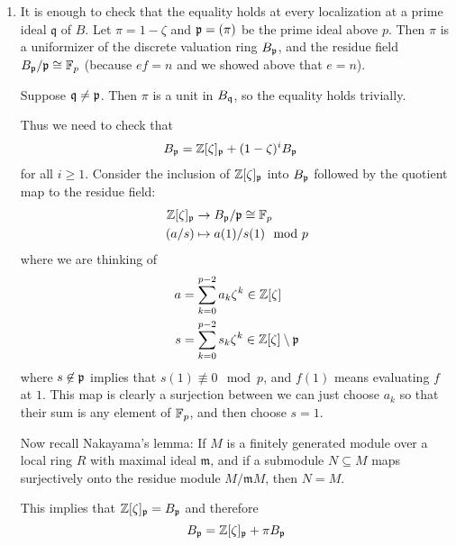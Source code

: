 \documentclass[12pt]{article}  %
\begin{document}
\begin{solution}
    \begin{enumerate}
        \item It is enough to check that the equality holds at every localization at a prime ideal $\mathfrak{q}$ of $B$. Let $\pi = 1 - \zeta$ and $\mathfrak{p} = (\pi)$ be the prime ideal above $p$. Then $\pi$ is a uniformizer of the discrete valuation ring $B_{\mathfrak{p}}$, and the residue field $B_{\mathfrak{p}}/\mathfrak{p} \cong \mathbb{F}_p$ (because $ef = n$ and we showed above that $e=n$).

Suppose $\mathfrak{q} \neq \mathfrak{p}$. Then $\pi$ is a unit in $B_{\mathfrak{q}}$, so the equality holds trivially.

Thus we need to check that \begin{align*}
    B_{\mathfrak{p}} &= \mathbb{Z}[\zeta]_{\mathfrak{p}} + (1-\zeta)^i B_{\mathfrak{p}} 
\end{align*}
for all $i \geq 1$. Consider the inclusion of $\mathbb{Z}[\zeta]_{\mathfrak{p}}$ into $B_{\mathfrak{p}}$ followed by the quotient map to the residue field:
\begin{align*}
    \mathbb{Z}[\zeta]_{\mathfrak{p}} &\to B_{\mathfrak{p}}/\mathfrak{p} \cong \mathbb{F}_p\\
    (a/s) &\mapsto a(1)/s(1) \mod p
\end{align*} 
where we are thinking of \begin{align*}
    a &= \sum_{k=0}^{p-2} a_k \zeta^k \in \mathbb{Z}[\zeta]\\   
    s &= \sum_{k=0}^{p-2} s_k \zeta^k \in \mathbb{Z}[\zeta] \setminus \mathfrak{p}
\end{align*} where $s\not\in \mathfrak{p}$ implies that $s(1) \not\equiv 0 \mod p$, and $f(1)$ means evaluating $f$ at $1$. This map is clearly a surjection between we can just choose $a_k$ so that their sum is any element of $\mathbb{F}_p$, and then choose $s=1$.

Now recall Nakayama's lemma: If $M$ is a finitely generated module over a local ring $R$ with maximal ideal $\mathfrak{m}$, and if a submodule $N\subseteq M$ maps surjectively onto the residue module $M/\mathfrak{m}M$, then $N=M$.

This implies that $\mathbb{Z}[\zeta]_{\mathfrak{p}} = B_{\mathfrak{p}}$ and therefore \[
    B_{\mathfrak{p}} = \mathbb{Z}[\zeta]_{\mathfrak{p}} + \pi B_{\mathfrak{p}}\]


\end{enumerate}
\end{solution}
\end{document}
